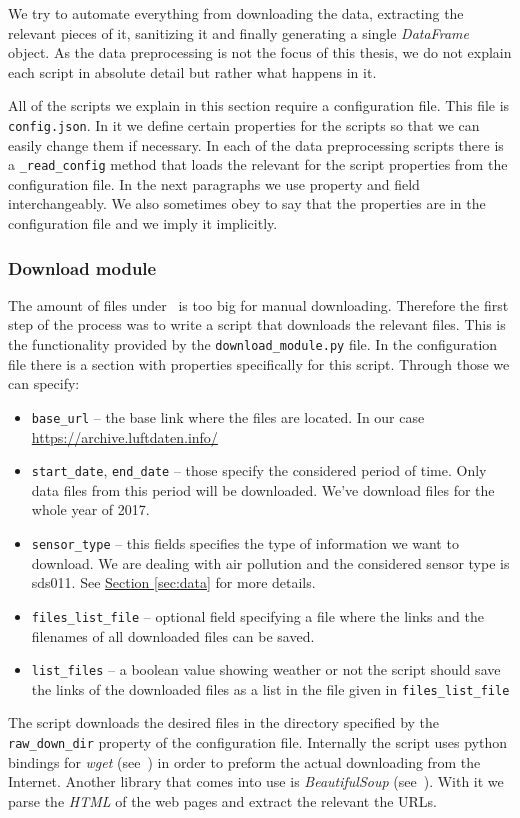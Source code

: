 \documentclass[12pt,a4paper,twoside]{scrartcl}
\numberwithin{equation}{section}
\newcommand{\refsec}[1]{\hyperref[#1]{Section \ref*{#1}}}
\begin{document}
We try to automate everything from downloading the data, extracting the relevant pieces of it, sanitizing it and finally generating a single \emph{DataFrame} object. As the data preprocessing is not the focus of this thesis, we do not explain each script in absolute detail but rather what happens in it.

All of the scripts we explain in this section require a configuration file. This file is \texttt{config.json}. In it we define certain properties for the scripts so that we can easily change them if necessary. In each of the data preprocessing scripts there is a \texttt{\_read\_config} method that loads the relevant for the script properties from the configuration file. In the next paragraphs we use property and field interchangeably. We also sometimes obey to say that the properties are in the configuration file and we imply it implicitly.
\subsubsection{Download module}\label{sec:down-module}
The amount of files under~\cite{luftdaten} is too big for manual downloading. Therefore the first step of the process was to write a script that downloads the relevant files. This is the functionality provided by the \texttt{download\_module.py} file. In the configuration file there is a section with properties specifically for this script. Through those we can specify:
\begin{itemize}
\item \texttt{base\_url} -- the base link where the files are located. In our case \url{https://archive.luftdaten.info/}
\item \texttt{start\_date}, \texttt{end\_date} -- those specify the considered period of time. Only data files from this period will be downloaded. We've download files for the whole year of 2017.
\item \texttt{sensor\_type} -- this fields specifies the type of information we want to download. We are dealing with air pollution and the considered sensor type is sds011. See \refsec{sec:data} for more details.
\item \texttt{files\_list\_file} -- optional field specifying a file where the links and the filenames of all downloaded files can be saved.
\item \texttt{list\_files} -- a boolean value showing weather or not the script should save the links of the downloaded files as a list in the file given in \texttt{files\_list\_file}
\end{itemize}
The script downloads the desired files in the directory specified by the \texttt{raw\_down\_dir} property of the configuration file. Internally the script uses python bindings for \emph{wget} (see~\cite{wget}) in order to preform the actual downloading from the Internet. Another library that comes into use is \emph{BeautifulSoup} (see~\cite{bs}). With it we parse the \emph{HTML} of the web pages and extract the relevant the URLs.
\end{document}
